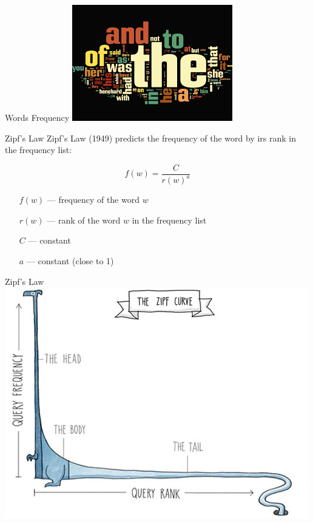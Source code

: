 \documentclass{beamer}
\begin{document}
\begin{frame}{Words Frequency}
    \includegraphics[width=\textwidth]{stopwords.png}
\end{frame}

    \begin{frame}{Zipf's Law}
        Zipf's Law (1949) predicts the frequency of the word by irs rank in the frequency list:

    \begin{equation}
      f(w) = \frac{C}{r(w)^a}
    \end{equation}
    \begin{itemize}
    \item[$f(w)$] — frequency of the word $w$
    \item[$r(w)$] — rank of the word $w$ in the frequency list
    \item[$C$] — constant
    \item[$a$] — constant (close to 1)
    \end{itemize}

    \end{frame}

    \begin{frame}{Zipf's Law}
         \includegraphics[width=\textwidth]{zipf-animal}

    \end{frame}
\end{document}
